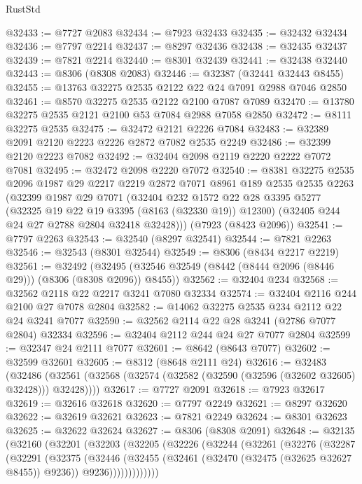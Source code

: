 \begin{lexlean}{RustStd}
\begin{coremodule}
@32433 := @7727 @2083
@32434 := @7923 @32433
@32435 := @32432 @32434
@32436 := @7797 @2214
@32437 := @8297 @32436
@32438 := @32435 @32437
@32439 := @7821 @2214
@32440 := @8301 @32439
@32441 := @32438 @32440
@32443 := @8306 (@8308 @2083)
@32446 := @32387 (@32441 @32443 @8455)
@32455 := @13763 @32275 @2535 @2122 @22 @24 @7091 @2988 @7046 @2850
@32461 := @8570 @32275 @2535 @2122 @2100 @7087 @7089
@32470 := @13780 @32275 @2535 @2121 @2100 @53 @7084 @2988 @7058 @2850
@32472 := @8111 @32275 @2535
@32475 := @32472 @2121 @2226 @7084
@32483 := @32389 @2091 @2120 @2223 @2226 @2872 @7082 @2535 @2249
@32486 := @32399 @2120 @2223 @7082
@32492 := @32404 @2098 @2119 @2220 @2222 @7072 @7081
@32495 := @32472 @2098 @2220 @7072
@32540 := @8381
    @32275
    @2535
    @2096
    @1987
    @29
    @2217
    @2219
    @2872
    @7071
    @8961
    @189
    @2535
    @2535
    @2263
    (@32399
      @1987
      @29
      @7071
      (@32404
        @232
        @1572
        @22
        @28
        @3395
        @5277
        (@32325 @19 @22 @19 @3395 (@8163 (@32330 @19)) @12300)
        (@32405 @244 @24 @27 @2788 @2804 @32418 @32428)))
    (@7923 (@8423 @2096))
@32541 := @7797 @2263
@32543 := @32540 (@8297 @32541)
@32544 := @7821 @2263
@32546 := @32543 (@8301 @32544)
@32549 := @8306 (@8434 @2217 @2219)
@32561 := @32492
    (@32495 (@32546 @32549 (@8442 (@8444 @2096 (@8446 @29))) (@8306 (@8308 @2096)) @8455))
@32562 := @32404 @234
@32568 := @32562 @2118 @22 @2217 @3241 @7080 @32334
@32574 := @32404 @2116 @244 @2100 @27 @7078 @2804
@32582 := @14062 @32275 @2535 @234 @2112 @22 @24 @3241 @7077
@32590 := @32562 @2114 @22 @28 @3241 (@2786 @7077 @2804) @32334
@32596 := @32404 @2112 @244 @24 @27 @7077 @2804
@32599 := @32347 @24 @2111 @7077
@32601 := @8642 (@8643 @7077)
@32602 := @32599 @32601
@32605 := @8312 (@8648 @2111 @24)
@32616 := @32483
    (@32486 (@32561 (@32568 (@32574 (@32582 (@32590 (@32596 (@32602 @32605) @32428))) @32428))))
@32617 := @7727 @2091
@32618 := @7923 @32617
@32619 := @32616 @32618
@32620 := @7797 @2249
@32621 := @8297 @32620
@32622 := @32619 @32621
@32623 := @7821 @2249
@32624 := @8301 @32623
@32625 := @32622 @32624
@32627 := @8306 (@8308 @2091)
@32648 := @32135
    (@32160
      (@32201
        (@32203
          (@32205
            (@32226
              (@32244
                (@32261
                  (@32276
                    (@32287
                      (@32291
                        (@32375
                          (@32446
                            (@32455
                              (@32461 (@32470 (@32475 (@32625 @32627 @8455)) @9236))
                              @9236)))))))))))))

\end{coremodule}
\end{lexlean}
